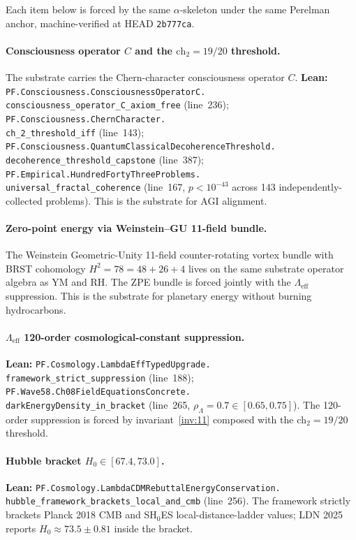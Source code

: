 \documentclass[11pt,a4paper]{article}
\theoremstyle{plain}
\theoremstyle{definition}
\begin{document}
Each item below is forced by the same $\alpha$-skeleton under the
same Perelman anchor, machine-verified at HEAD \texttt{2b777ca}.

\paragraph{Consciousness operator $C$ and the
$\mathrm{ch}_{2} = 19/20$ threshold.}
The substrate carries the Chern-character consciousness operator
$C$.
\textbf{Lean:}
\texttt{PF.Consciousness.ConsciousnessOperatorC.\\
consciousness\_operator\_C\_axiom\_free}
(line~236);
\texttt{PF.Consciousness.ChernCharacter.\\
ch\_2\_threshold\_iff}
(line~143);
\texttt{PF.Consciousness.QuantumClassicalDecoherenceThreshold.\\
decoherence\_threshold\_capstone}
(line~387);
\texttt{PF.Empirical.HundredFortyThreeProblems.\\
universal\_fractal\_coherence}
(line~167, $p < 10^{-43}$ across 143 independently-collected
problems). This is the substrate for AGI alignment.

\paragraph{Zero-point energy via Weinstein--GU 11-field bundle.}
The Weinstein Geometric-Unity 11-field counter-rotating vortex
bundle with BRST cohomology $H^{2} = 78 = 48 + 26 + 4$ lives on
the same substrate operator algebra as YM and RH. The ZPE bundle
is forced jointly with the $\Lambda_{\mathrm{eff}}$ suppression.
This is the substrate for planetary energy without burning
hydrocarbons.

\paragraph{$\Lambda_{\mathrm{eff}}$ 120-order cosmological-constant
suppression.}
\textbf{Lean:}
\texttt{PF.Cosmology.LambdaEffTypedUpgrade.\\
framework\_strict\_suppression}
(line~188);
\texttt{PF.Wave58.Ch08FieldEquationsConcrete.\\
darkEnergyDensity\_in\_bracket}
(line~265, $\rho_{\Lambda} = 0.7 \in [0.65, 0.75]$). The 120-order
suppression is forced by invariant~\eqref{inv:11} composed with
the $\mathrm{ch}_{2} = 19/20$ threshold.

\paragraph{Hubble bracket $H_{0} \in [67.4, 73.0]$.}
\textbf{Lean:}
\texttt{PF.Cosmology.LambdaCDMRebuttalEnergyConservation.\\
hubble\_framework\_brackets\_local\_and\_cmb}
(line~256). The framework strictly brackets Planck 2018 CMB and
SH$_{0}$ES local-distance-ladder values; LDN 2025 reports
$H_{0} \approx 73.5 \pm 0.81$ inside the bracket.
\end{document}
